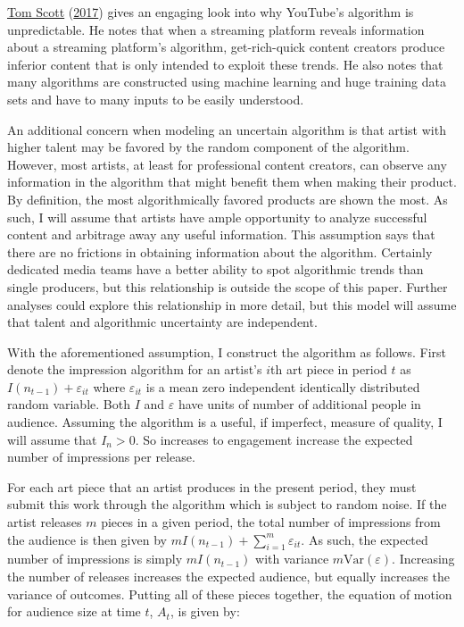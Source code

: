 \documentclass[
]{article}
\begin{document}
\protect\hyperlink{ref-tomscottWhyYouTubeAlgorithm2017}{Tom Scott}
(\protect\hyperlink{ref-tomscottWhyYouTubeAlgorithm2017}{2017}) gives an
engaging look into why YouTube's algorithm is unpredictable. He notes
that when a streaming platform reveals information about a streaming
platform's algorithm, get-rich-quick content creators produce inferior
content that is only intended to exploit these trends. He also notes
that many algorithms are constructed using machine learning and huge
training data sets and have to many inputs to be easily understood.

An additional concern when modeling an uncertain algorithm is that
artist with higher talent may be favored by the random component of the
algorithm. However, most artists, at least for professional content
creators, can observe any information in the algorithm that might
benefit them when making their product. By definition, the most
algorithmically favored products are shown the most. As such, I will
assume that artists have ample opportunity to analyze successful content
and arbitrage away any useful information. This assumption says that
there are no frictions in obtaining information about the algorithm.
Certainly dedicated media teams have a better ability to spot
algorithmic trends than single producers, but this relationship is
outside the scope of this paper. Further analyses could explore this
relationship in more detail, but this model will assume that talent and
algorithmic uncertainty are independent.

With the aforementioned assumption, I construct the algorithm as
follows. First denote the impression algorithm for an artist's \(i\)th
art piece in period \(t\) as \(I(n_{t-1})+\varepsilon_{it}\) where
\(\varepsilon_{it}\) is a mean zero independent identically distributed
random variable. Both \(I\) and \(\varepsilon\) have units of number of
additional people in audience. Assuming the algorithm is a useful, if
imperfect, measure of quality, I will assume that \(I_n>0\). So
increases to engagement increase the expected number of impressions per
release.

For each art piece that an artist produces in the present period, they
must submit this work through the algorithm which is subject to random
noise. If the artist releases \(m\) pieces in a given period, the total
number of impressions from the audience is then given by
\(mI(n_{t-1})+\sum_{i=1}^m \varepsilon_{it}\). As such, the expected
number of impressions is simply \(mI(n_{t-1})\) with variance
\(m\textrm{Var}(\varepsilon)\). Increasing the number of releases
increases the expected audience, but equally increases the variance of
outcomes. Putting all of these pieces together, the equation of motion
for audience size at time \(t\), \(A_t\), is given by:
\end{document}

